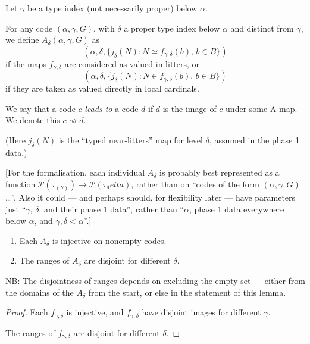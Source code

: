 \begin{definition}
\label {def:a-map}
\leanok
Let $\gamma$ be a type index (not necessarily proper) below $\alpha$.

For any code $(\alpha,\gamma,G)$, with $\delta$ a proper type index below $\alpha$ and distinct from $\gamma$, we define
$A_\delta(\alpha,\gamma,G)$ as
$$(\alpha,\delta,\{ j_\delta(N) : N \simeq f_{\gamma,\delta}(b),\, b \in B \})$$
if the maps $f_{\gamma,\delta}$ are considered as valued in litters, or
$$(\alpha,\delta,\{ j_\delta(N) : N \in f_{\gamma,\delta}(b),\, b \in B \})$$
if they are taken as valued directly in local cardinals.

We say that a code $c$ \emph{leads to} a code $d$ if $d$ is the image of $c$ under some A-map. We denote this $c \rightsquigarrow d$.

(Here $j_\delta(N)$ is the “typed near-litters” map for level $\delta$, assumed in the phase 1 data.)

[For the formalisation, each individual $A_\delta$ is probably best represented as a function $\mathcal{P}(\tau_(\gamma)) \to \mathcal{P}(\tau_delta)$, rather than on “codes of the form $(\alpha,\gamma,G)$…”.  Also it could — and perhaps should, for flexibility later — have parameters just “$\gamma$, $\delta$, and their phase 1 data”, rather than “$\alpha$, phase 1 data everywhere below $\alpha$, and $\gamma,\delta < \alpha$”.]
\end{definition}

\begin{lemma}
\label {lem:a-map-properties}
\leanok
\begin{enumerate}
\item Each $A_\delta$ is injective on nonempty codes.
\item The ranges of $A_\delta$ are disjoint for different $\delta$.
\end{enumerate}

NB: The disjointness of ranges depends on excluding the empty set --- either from the domains of the $A_\delta$ from the start, or else in the statement of this lemma.
\end{lemma}
\begin{proof}
\leanok
\item Each $f_{\gamma,\delta}$ is injective, and $f_{\gamma,\delta}$ have disjoint images for different $\gamma$.
\item The ranges of $f_{\gamma,\delta}$ are disjoint for different $\delta$.
\end{proof}


